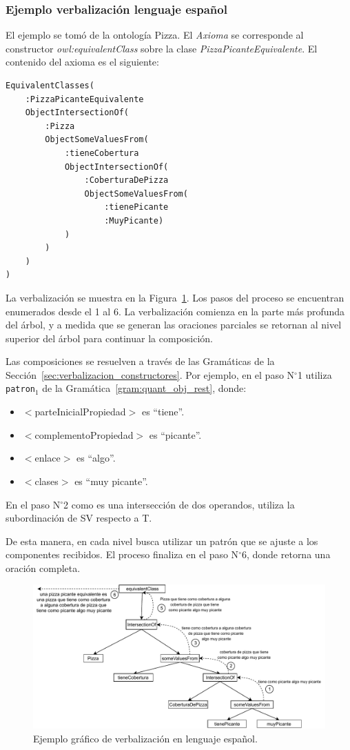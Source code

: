 \subsubsection{Ejemplo verbalización lenguaje español}
El ejemplo se tomó de la ontología Pizza. El \textit{Axioma }se corresponde al constructor \emph{owl:equivalentClass} sobre la clase \emph{PizzaPicanteEquivalente}. El contenido del axioma es el siguiente: 
\begin{verbatim}
EquivalentClasses(
    :PizzaPicanteEquivalente
    ObjectIntersectionOf(
        :Pizza
        ObjectSomeValuesFrom(
            :tieneCobertura
            ObjectIntersectionOf(
                :CoberturaDePizza
                ObjectSomeValuesFrom(
                    :tienePicante
                    :MuyPicante)
            )
        )
    )
)    
\end{verbatim}
La verbalización se muestra en la Figura~\ref{fig:ejemplo_verb_espaniol}.
Los pasos del proceso se encuentran enumerados desde el 1 al 6. La verbalización comienza en la parte más profunda del árbol, y a medida que se generan las oraciones parciales se retornan al nivel superior del árbol para continuar la composición.

Las composiciones se resuelven a través de las Gramáticas de la Sección~\ref{sec:verbalizacion_constructores}. Por ejemplo, en el paso N$^\circ$1 utiliza {\tt patron$_1$} de la Gramática~\ref{gram:quant_obj_rest}, donde:
\begin{itemize}
    \item $<$parteInicialPropiedad$>$ es ``tiene''.
    \item $<$complementoPropiedad$>$ es ``picante''.
    \item $<$enlace$>$ es ``algo''.
    \item $<$clases$>$ es ``muy picante''.
\end{itemize}

En el paso N$^\circ$2 como es una intersección de dos operandos, utiliza la subordinación de SV respecto a T.

De esta manera, en cada nivel busca utilizar un patrón que se ajuste a los componentes recibidos. El proceso finaliza en el paso N$^\circ$6, donde retorna una oración completa.

\begin{figure}
    \centering
    \includegraphics[width=\textwidth]{img/generacion_documento/verbalizacion_equivalentClass_spanish.pdf}
    \caption{Ejemplo gráfico de verbalización en lenguaje español.}
    \label{fig:ejemplo_verb_espaniol}
\end{figure}

